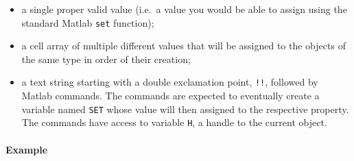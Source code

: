  \begin{itemize}
 \item
   a single proper valid value (i.e.~a value you would be able to assign
   using the standard Matlab \texttt{set} function);
 \item
   a cell array of multiple different values that will be assigned to the
   objects of the same type in order of their creation;
 \item
   a text string starting with a double exclamation point, \texttt{!!},
   followed by Matlab commands. The commands are expected to eventually
   create a variable named \texttt{SET} whose value will then assigned to
   the respective property. The commands have access to variable
   \texttt{H}, a handle to the current object.
 \end{itemize}
 
 \paragraph{Example}


